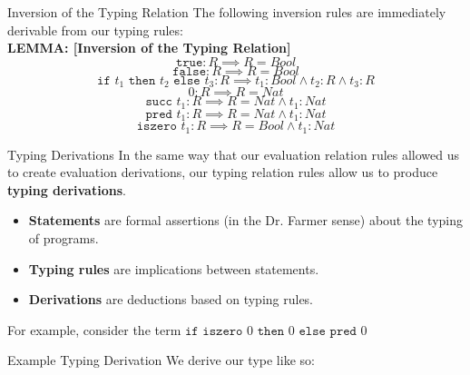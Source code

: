 \documentclass[11pt]{beamer}
\begin{document}
\begin{frame}[fragile=singleslide]{Inversion of the Typing Relation}
The following inversion rules are immediately derivable from our typing rules: \\
\vspace{1em}
\textbf{LEMMA: [Inversion of the Typing Relation]}
\begin{equation}
\texttt{true} : R \implies R = Bool
\end{equation}
\begin{equation}
\texttt{false} : R \implies R = Bool
\end{equation}
\begin{equation}
\texttt{if } t_1 \texttt{ then } t_2 \texttt{ else } t_3 : R \implies t_1 : Bool \land t_2 : R \land t_3 : R
\end{equation}
\begin{equation}
0 : R \implies R = Nat
\end{equation}
\begin{equation}
\texttt{succ } t_1 : R \implies R = Nat \land t_1 : Nat
\end{equation}
\begin{equation}
\texttt{pred } t_1 : R \implies R = Nat \land t_1 : Nat
\end{equation}
\begin{equation}
\texttt{iszero } t_1 : R \implies R = Bool \land t_1 : Nat
\end{equation}
\end{frame}

\begin{frame}[fragile=singleslide]{Typing Derivations}
In the same way that our evaluation relation rules allowed us to create evaluation derivations, our typing relation rules allow us to produce \textbf{typing derivations}.
\begin{itemize}
\item \textbf{Statements} are formal assertions (in the Dr. Farmer sense) about the typing of programs.
\item \textbf{Typing rules} are implications between statements.
\item \textbf{Derivations} are deductions based on typing rules.  
\end{itemize}
For example, consider the term $\texttt{if iszero } 0 \texttt{ then } 0 \texttt{ else pred } 0$
\end{frame}


\begin{frame}[fragile=singleslide]{Example Typing Derivation}
We derive our type like so:
{\tiny
\begin{flagderiv}
\end{flagderiv}}

\end{frame}
\end{document}
